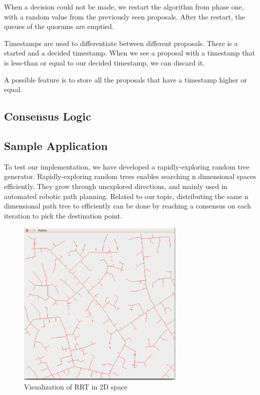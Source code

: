 \documentclass[times, 12pt,twocolumn]{article}
\begin{document}
When a decision could not be made, we restart the algorithm from phase one, with 
a random value from the previously seen proposals. After the restart, the 
queues of the quorums are emptied.

Timestamps are used to differentiate between different proposals. There is a started 
and a decided timestamp. When we see a proposal with a timestamp that is less-than 
or equal to our decided timestamp, we can discard it. 

A possible feature is to store all the proposals that have a timestamp higher or equal.



\subsection{Consensus Logic}

\subsection{Sample Application}

To test our implementation, we have developed a rapidly-exploring random tree generator. Rapidly-exploring random trees\cite{Lavalle98rapidly-exploringrandom} enables searching n dimensional spaces efficiently. They grow through unexplored directions, and mainly used in automated robotic path planning. Related to our topic, distributing the same n dimensional path tree to efficiently can be done by reaching a consensus on each iteration to pick the destination point.


\begin{figure}[ht!]
\centering
\includegraphics[width=80mm]{rrt.png}
\caption{Visualization of RRT in 2D space}
\label{fig:rrt}
\end{figure}
\end{document}
